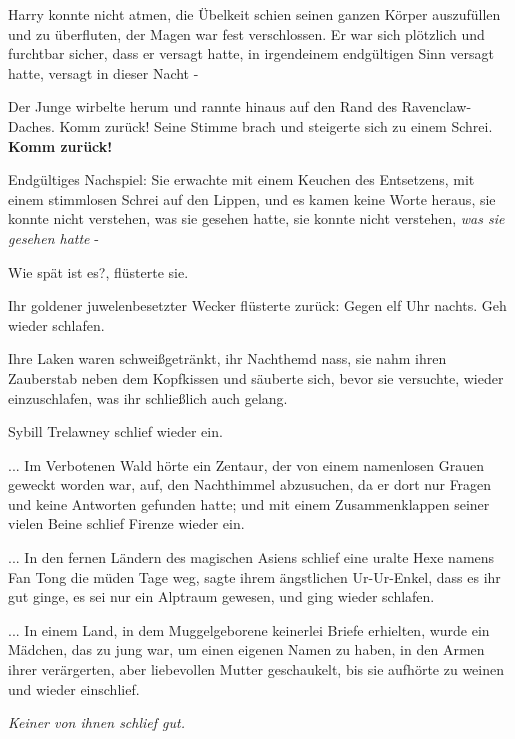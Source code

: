Harry konnte nicht atmen, die Übelkeit schien seinen ganzen Körper auszufüllen
und zu überfluten, der Magen war fest verschlossen. Er war sich plötzlich und
furchtbar sicher, dass er versagt hatte, in irgendeinem endgültigen Sinn versagt
hatte, versagt in dieser Nacht -

Der Junge wirbelte herum und rannte hinaus auf den Rand des Ravenclaw-Daches.
\glqq{}Komm zurück!\grqq{} Seine Stimme brach und steigerte sich zu einem Schrei.
\glqq{}\textbf{Komm zurück!}\grqq{}

Endgültiges Nachspiel: Sie erwachte mit einem Keuchen des Entsetzens, mit einem
stimmlosen Schrei auf den Lippen, und es kamen keine Worte heraus, sie konnte
nicht verstehen, was sie gesehen hatte, sie konnte nicht verstehen, \emph{was
sie gesehen hatte} -

\glqq{}Wie spät ist es?\grqq{}, flüsterte sie.

Ihr goldener juwelenbesetzter Wecker flüsterte zurück: \glqq{}Gegen elf Uhr
nachts. Geh wieder schlafen.\grqq{}

Ihre Laken waren schweißgetränkt, ihr Nachthemd nass, sie nahm ihren Zauberstab
neben dem Kopfkissen und säuberte sich, bevor sie versuchte, wieder
einzuschlafen, was ihr schließlich auch gelang.

Sybill Trelawney schlief wieder ein.

... Im Verbotenen Wald hörte ein Zentaur, der von einem namenlosen Grauen
geweckt worden war, auf, den Nachthimmel abzusuchen, da er dort nur Fragen und
keine Antworten gefunden hatte; und mit einem Zusammenklappen seiner vielen
Beine schlief Firenze wieder ein.

... In den fernen Ländern des magischen Asiens schlief eine uralte Hexe namens
Fan Tong die müden Tage weg, sagte ihrem ängstlichen Ur-Ur-Enkel, dass es ihr
gut ginge, es sei nur ein Alptraum gewesen, und ging wieder schlafen.

... In einem Land, in dem Muggelgeborene keinerlei Briefe erhielten, wurde ein
Mädchen, das zu jung war, um einen eigenen Namen zu haben, in den Armen ihrer
verärgerten, aber liebevollen Mutter geschaukelt, bis sie aufhörte zu weinen und
wieder einschlief.

\emph{Keiner von ihnen schlief gut.
}

